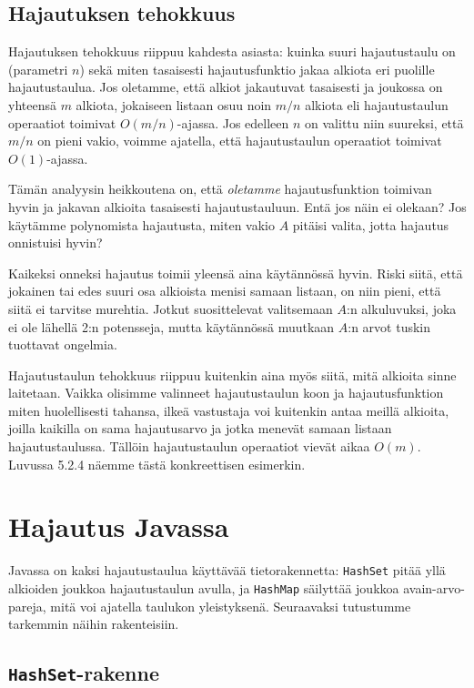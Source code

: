 \subsection{Hajautuksen tehokkuus}

Hajautuksen tehokkuus riippuu kahdesta asiasta:
kuinka suuri hajautustaulu on (parametri $n$)
sekä miten tasaisesti hajautusfunktio jakaa alkiota
eri puolille hajautustaulua.
Jos oletamme, että alkiot jakautuvat tasaisesti
ja joukossa on yhteensä $m$ alkiota,
jokaiseen listaan osuu noin $m/n$ alkiota
eli hajautustaulun operaatiot toimivat $O(m/n)$-ajassa.
Jos edelleen $n$ on valittu niin suureksi,
että $m/n$ on pieni vakio, voimme ajatella,
että hajautustaulun operaatiot toimivat $O(1)$-ajassa.

Tämän analyysin heikkoutena on, että \emph{oletamme}
hajautusfunktion toimivan hyvin ja jakavan alkioita
tasaisesti hajautustauluun. Entä jos näin ei olekaan?
Jos käytämme polynomista hajautusta, miten vakio $A$
pitäisi valita, jotta hajautus onnistuisi hyvin?

Kaikeksi onneksi hajautus toimii yleensä aina käytännössä hyvin.
Riski siitä, että jokainen tai edes suuri osa alkioista
menisi samaan listaan, on niin pieni,
että siitä ei tarvitse murehtia.
Jotkut suosittelevat valitsemaan $A$:n alkuluvuksi,
joka ei ole lähellä 2:n potensseja,
mutta käytännössä muutkaan $A$:n arvot tuskin
tuottavat ongelmia.

Hajautustaulun tehokkuus riippuu kuitenkin aina myös siitä,
mitä alkioita sinne laitetaan.
Vaikka olisimme valinneet hajautustaulun koon ja
hajautusfunktion miten huolellisesti tahansa,
ilkeä vastustaja voi kuitenkin antaa meillä alkioita,
joilla kaikilla on sama hajautusarvo ja jotka
menevät samaan listaan hajautustaulussa.
Tällöin hajautustaulun operaatiot vievät aikaa $O(m)$.
Luvussa 5.2.4 näemme tästä konkreettisen esimerkin.

\section{Hajautus Javassa}

Javassa on kaksi hajautustaulua käyttävää tietorakennetta:
\texttt{HashSet} pitää yllä alkioiden joukkoa
hajautustaulun avulla, ja \texttt{HashMap} säilyttää
joukkoa avain-arvo-pareja, mitä voi ajatella taulukon yleistyksenä.
Seuraavaksi tutustumme tarkemmin näihin rakenteisiin.

\subsection{\texttt{HashSet}-rakenne}

